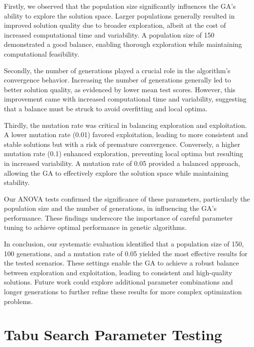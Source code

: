 \documentclass[
]{article}
\begin{document}
    Firstly, we observed that the population size significantly influences the GA's ability to explore the solution space. Larger populations generally resulted in improved solution quality due to broader exploration, albeit at the cost of increased computational time and variability. A population size of 150 demonstrated a good balance, enabling thorough exploration while maintaining computational feasibility.

    Secondly, the number of generations played a crucial role in the algorithm's convergence behavior. Increasing the number of generations generally led to better solution quality, as evidenced by lower mean test scores. However, this improvement came with increased computational time and variability, suggesting that a balance must be struck to avoid overfitting and local optima.

    Thirdly, the mutation rate was critical in balancing exploration and exploitation. A lower mutation rate (0.01) favored exploitation, leading to more consistent and stable solutions but with a risk of premature convergence. Conversely, a higher mutation rate (0.1) enhanced exploration, preventing local optima but resulting in increased variability. A mutation rate of 0.05 provided a balanced approach, allowing the GA to effectively explore the solution space while maintaining stability.

    Our ANOVA tests confirmed the significance of these parameters, particularly the population size and the number of generations, in influencing the GA's performance. These findings underscore the importance of careful parameter tuning to achieve optimal performance in genetic algorithms.

    In conclusion, our systematic evaluation identified that a population size of 150, 100 generations, and a mutation rate of 0.05 yielded the most effective results for the tested scenarios. These settings enable the GA to achieve a robust balance between exploration and exploitation, leading to consistent and high-quality solutions. Future work could explore additional parameter combinations and longer generations to further refine these results for more complex optimization problems.

    \clearpage

    \newpage


    \section{Tabu Search Parameter Testing}
\end{document}
